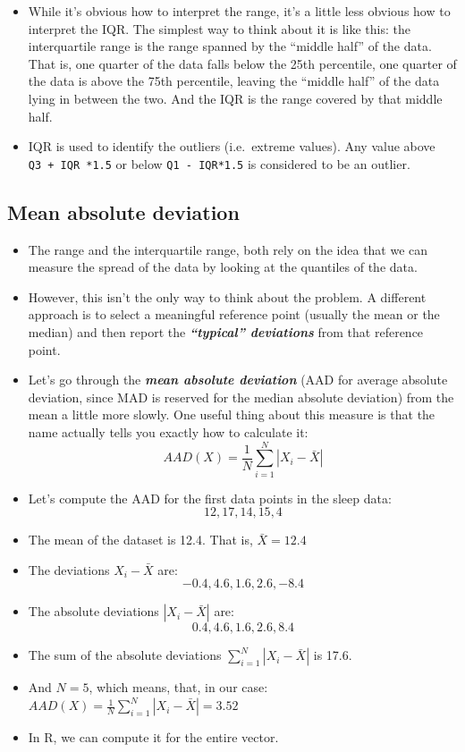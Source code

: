 \documentclass[
]{book}
\begin{document}
\begin{itemize}
\item
  While it's obvious how to interpret the range, it's a little less obvious how to interpret the IQR. The simplest way to think about it is like this: the interquartile range is the range spanned by the ``middle half'' of the data. That is, one quarter of the data falls below the 25th percentile, one quarter of the data is above the 75th percentile, leaving the ``middle half'' of the data lying in between the two. And the IQR is the range covered by that middle half.
\item
  IQR is used to identify the outliers (i.e.~extreme values). Any value above \texttt{Q3\ +\ IQR\ *1.5} or below \texttt{Q1\ -\ IQR*1.5} is considered to be an outlier.
\end{itemize}

\hypertarget{aad}{%
\subsection{Mean absolute deviation}\label{aad}}

\begin{itemize}
\item
  The range and the interquartile range, both rely on the idea that we can measure the spread of the data by looking at the quantiles of the data.
\item
  However, this isn't the only way to think about the problem. A different approach is to select a meaningful reference point (usually the mean or the median) and then report the \textbf{\emph{``typical'' deviations}} from that reference point.
\item
  Let's go through the \textbf{\emph{mean absolute deviation}} (AAD for average absolute deviation, since MAD is reserved for the median absolute deviation) from the mean a little more slowly. One useful thing about this measure is that the name actually tells you exactly how to calculate it:
  \[
  AAD(X) = \frac{1}{N} \sum_{i = 1}^N |X_i - \bar{X}|
  \]
\item
  Let's compute the AAD for the first data points in the sleep data:
  \[
  12, 17, 14, 15, 4
  \]
\item
  The mean of the dataset is 12.4. That is, \(\bar{X} = 12.4\)
\item
  The deviations \(X_i - \bar{X}\) are:
  \[
  -0.4, 4.6, 1.6, 2.6, -8.4
  \]
\item
  The absolute deviations \(|X_i - \bar{X}|\) are:
  \[
  0.4, 4.6, 1.6, 2.6, 8.4
  \]
\item
  The sum of the absolute deviations \(\sum_{i = 1}^N |X_i - \bar{X}|\) is 17.6.
\item
  And \(N=5\), which means, that, in our case: \(AAD(X) = \frac{1}{N} \sum_{i = 1}^N |X_i - \bar{X}| = 3.52\)
\item
  In R, we can compute it for the entire vector.
\end{itemize}
\end{document}
